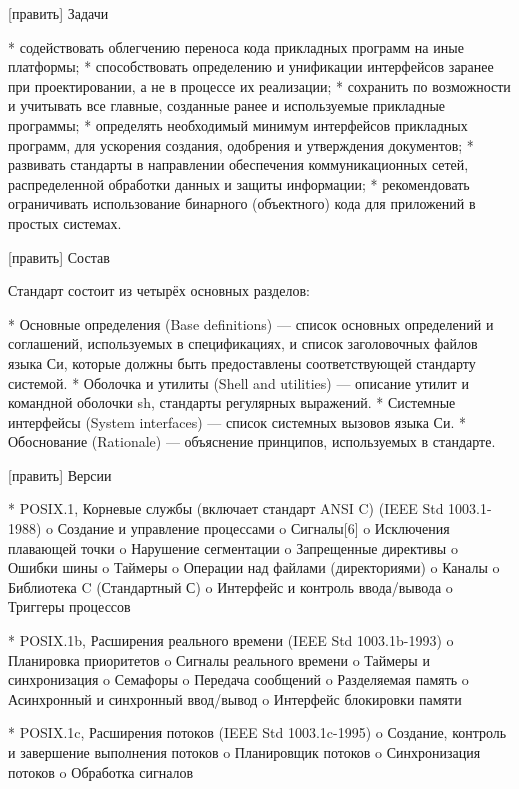 [править] Задачи

    * содействовать облегчению переноса кода прикладных программ на иные платформы;
    * способствовать определению и унификации интерфейсов заранее при проектировании, а не в процессе их реализации;
    * сохранить по возможности и учитывать все главные, созданные ранее и используемые прикладные программы;
    * определять необходимый минимум интерфейсов прикладных программ, для ускорения создания, одобрения и утверждения документов;
    * развивать стандарты в направлении обеспечения коммуникационных сетей, распределенной обработки данных и защиты информации;
    * рекомендовать ограничивать использование бинарного (объектного) кода для приложений в простых системах.

[править] Состав

Стандарт состоит из четырёх основных разделов:

    * Основные определения (Base definitions) — список основных определений и соглашений, используемых в спецификациях, и список заголовочных файлов языка Си, которые должны быть предоставлены соответствующей стандарту системой.
    * Оболочка и утилиты (Shell and utilities) — описание утилит и командной оболочки sh, стандарты регулярных выражений.
    * Системные интерфейсы (System interfaces) — список системных вызовов языка Си.
    * Обоснование (Rationale) — объяснение принципов, используемых в стандарте.

[править] Версии

    * POSIX.1, Корневые службы (включает стандарт ANSI C) (IEEE Std 1003.1-1988)
          o Создание и управление процессами
          o Сигналы[6]
          o Исключения плавающей точки
          o Нарушение сегментации
          o Запрещенные директивы
          o Ошибки шины
          o Таймеры
          o Операции над файлами (директориями)
          o Каналы
          o Библиотека C (Стандартный С)
          o Интерфейс и контроль ввода/вывода
          o Триггеры процессов

    * POSIX.1b, Расширения реального времени (IEEE Std 1003.1b-1993)
          o Планировка приоритетов
          o Сигналы реального времени
          o Таймеры и синхронизация
          o Семафоры
          o Передача сообщений
          o Разделяемая память
          o Асинхронный и синхронный ввод/вывод
          o Интерфейс блокировки памяти

    * POSIX.1c, Расширения потоков (IEEE Std 1003.1c-1995)
          o Создание, контроль и завершение выполнения потоков
          o Планировщик потоков
          o Синхронизация потоков
          o Обработка сигналов

